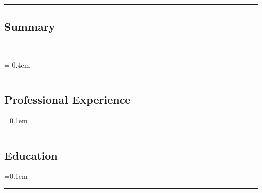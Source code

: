 





\hrule
\vspace{-0.4em}
\subsection*{Summary}
\
\begin{description}
  \parskip=-0.4em

  
  
\end{description}

\hrule
\vspace{-0.4em}
\subsection*{Professional Experience}
\begin{itemize}
  \parskip=0.1em
  
  
  
\end{itemize}


\hrule
\vspace{-0.4em}
\subsection*{Education}
\begin{itemize}
  \parskip=0.1em

  
\end{itemize}
\hrule

%  

\vspace*{\fill}



